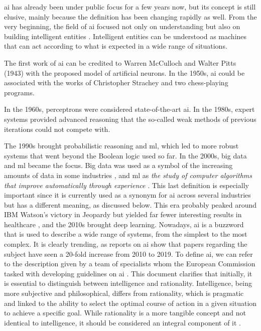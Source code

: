 


\ac{ai} has already been under public focus for a few years now, but its concept is still elusive, mainly because the definition has been changing rapidly as well. From the very beginning, the field of \ac{ai} focused not only on understanding but also on building intelligent entities \cite{DBLP:books/aw/RN2020}. Intelligent entities can be understood as machines that can act according to what is expected in a wide range of situations.

The first work of \ac{ai} can be credited to Warren McCulloch and Walter Pitts (1943) with the proposed model of artificial neurons. In the 1950s, \ac{ai} could be associated with the works of Christopher Strachey and two chess-playing programs.

In the 1960s, perceptrons were considered state-of-the-art \ac{ai}. In the 1980s, expert systems provided advanced reasoning that the so-called weak methods of previous iterations could not compete with.

The 1990s brought probabilistic reasoning and \ac{ml}, which led to more robust systems that went beyond the Boolean logic used so far. In the 2000s, big data and \ac{ml} became the focus. Big data was used as a symbol of the increasing amounts of data in some industries \cite{dashBigDataHealthcare2019}, and \ac{ml} as \textit{the study of computer algorithms that improve automatically through experience} \cite{mitchell1997machine}. This last definition is especially important since it is currently used as a synonym for \ac{ai} across several industries but has a different meaning, as discussed below. This era probably peaked around IBM Watson's victory in Jeopardy but yielded far fewer interesting results in healthcare \cite{swetlitzIBMWatsonSupercomputer2018}, and the 2010s brought deep learning.
Nowadays, \ac{ai} is a buzzword that is used to describe a wide range of systems, from the simplest to the most complex. It is clearly trending, as reports on \ac{ai} show that papers regarding the subject have seen a 20-fold increase from 2010 to 2019.
To define \ac{ai}, we can refer to the description given by a team of specialists whom the European Commission tasked with developing guidelines on \ac{ai} \cite{DefinitionAIMain2019}. This document clarifies that initially, it is essential to distinguish between intelligence and rationality. Intelligence, being more subjective and philosophical, differs from rationality, which is pragmatic and linked to the ability to select the optimal course of action in a given situation to achieve a specific goal. While rationality is a more tangible concept and not identical to intelligence, it should be considered an integral component of it \cite{DefinitionAIMain2019,DBLP:books/aw/RN2020}.

